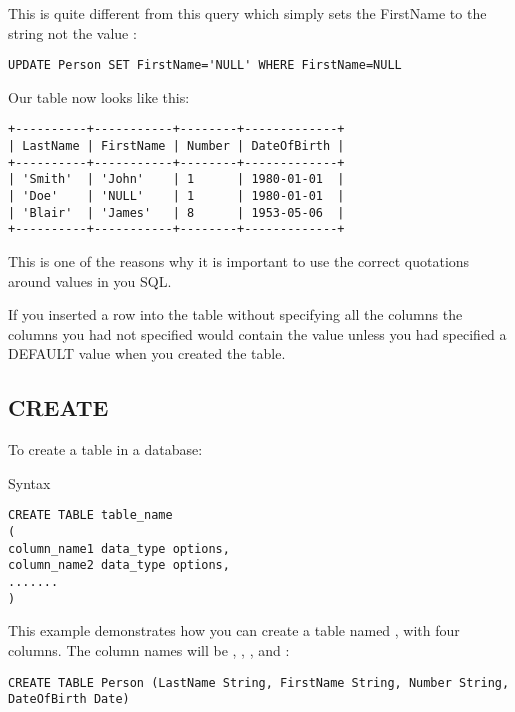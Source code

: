 \documentclass{howto}
\begin{document}
This is quite different from this query which simply sets the FirstName to the string  not the value :
\begin{verbatim}
UPDATE Person SET FirstName='NULL' WHERE FirstName=NULL
\end{verbatim}

Our table now looks like this:
\begin{verbatim}
+----------+-----------+--------+-------------+
| LastName | FirstName | Number | DateOfBirth |
+----------+-----------+--------+-------------+
| 'Smith'  | 'John'    | 1      | 1980-01-01  |
| 'Doe'    | 'NULL'    | 1      | 1980-01-01  |
| 'Blair'  | 'James'   | 8      | 1953-05-06  |
+----------+-----------+--------+-------------+
\end{verbatim}

This is one of the reasons why it is important to use the correct quotations around values in you SQL.


If you inserted a row into the table without specifying all the columns the columns you had not specified would contain the value  unless you had specified a DEFAULT value when you created the table.

\subsection{CREATE}

To create a table in a database:

Syntax
\begin{verbatim}
CREATE TABLE table_name
(
column_name1 data_type options,
column_name2 data_type options,
.......
)
\end{verbatim}


This example demonstrates how you can create a table named , with four columns. The column names will be , , , and :

\begin{verbatim}
CREATE TABLE Person (LastName String, FirstName String, Number String, DateOfBirth Date)
\end{verbatim}
\end{document}
